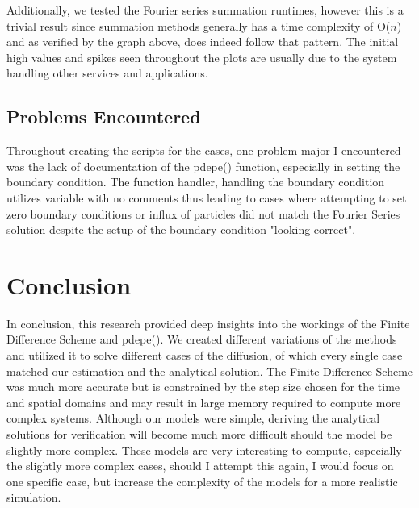 \documentclass{article}
\begin{document}
Additionally, we tested the Fourier series summation runtimes, however this is a trivial result since summation methods generally has a time complexity of O($n$) and as verified by the graph above, does indeed follow that pattern. The initial high values and spikes seen throughout the plots are usually due to the system handling other services and applications.
\newpage
\subsection{Problems Encountered}
Throughout creating the scripts for the cases, one problem major I encountered was the lack of documentation of the pdepe() function, especially in setting the boundary condition. The function handler, handling the boundary condition utilizes variable with no comments thus leading to cases where attempting to set zero boundary conditions or influx of particles did not match the Fourier Series solution despite the setup of the boundary condition "looking correct".
\section{Conclusion}
In conclusion, this research provided deep insights into the workings of the Finite Difference Scheme and pdepe(). We created different variations of the methods and utilized it to solve different cases of the diffusion, of which every single case matched our estimation and the analytical solution. The Finite Difference Scheme was much more accurate but is constrained by the step size chosen for the time and spatial domains and may result in large memory required to compute more complex systems. Although our models were simple, deriving the analytical solutions for verification will become much more difficult should the model be slightly more complex. These models are very interesting to compute, especially the slightly more complex cases, should I attempt this again, I would focus on one specific case, but increase the complexity of the models for a more realistic simulation.
\end{document}
